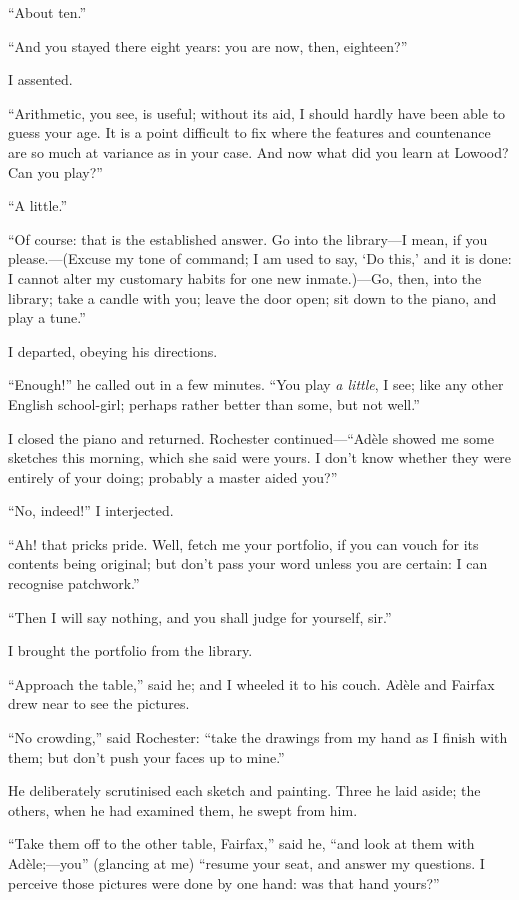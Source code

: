 \enquote{About ten.}

\enquote{And you stayed there eight years: you are now, then, eighteen?}

I assented.

\enquote{Arithmetic, you see, is useful; without its aid, I should
hardly have been able to guess your age. It is a point difficult to fix
where the features and countenance are so much at variance as in your
case. And now what did you learn at Lowood? Can you play?}

\enquote{A little.}

\enquote{Of course: that is the established answer. Go into the
library---I mean, if you please.---(Excuse my tone of command; I am used
to say, \enquote{Do this,} and it is done: I cannot alter my customary
habits for one new inmate.)---Go, then, into the library; take a candle
with you; leave the door open; sit down to the piano, and play a tune.}

I departed, obeying his directions.

\enquote{Enough!} he called out in a few minutes. \enquote{You play \emph{a
little}, I see; like any other English school-girl; perhaps rather
better than some, but not well.}

I closed the piano and returned. \Mr{} Rochester
continued---\enquote{Adèle showed me some sketches this morning, which
she said were yours. I don't know whether they were entirely of your
doing; probably a master aided you?}

\enquote{No, indeed!} I interjected.

\enquote{Ah! that pricks pride. Well, fetch me your portfolio, if you
can vouch for its contents being original; but don't pass your word
unless you are certain: I can recognise patchwork.}

\enquote{Then I will say nothing, and you shall judge for yourself,
sir.}

I brought the portfolio from the library.

\enquote{Approach the table,} said he; and I wheeled it to his couch. 
Adèle and \Mrs{} Fairfax drew near to see the pictures.

\enquote{No crowding,} said \Mr{} Rochester: \enquote{take the drawings
from my hand as I finish with them; but don't push your faces up to
mine.}

He deliberately scrutinised each sketch and painting. Three he laid
aside; the others, when he had examined them, he swept from him.

\enquote{Take them off to the other table, \Mrs{} Fairfax,} said he,
\enquote{and look at them with Adèle;---you} (glancing at me)
\enquote{resume your seat, and answer my questions. I perceive those
pictures were done by one hand: was that hand yours?}

